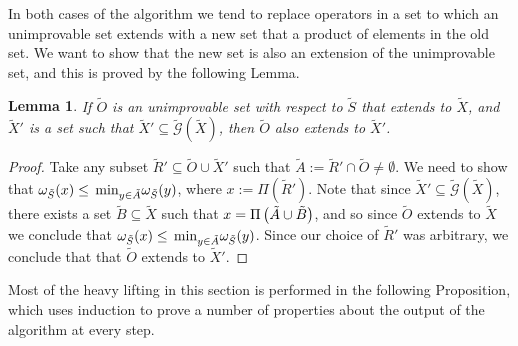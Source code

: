 \documentclass[twocolumn,showpacs,preprintnumbers,amsmath,amssymb,nofootinbib,pra,floatfix]{revtex4-1}
\newtheorem{lemma}{Lemma}
\newenvironment{remark}[1][Remark]{\begin{trivlist}
\item[\hskip \labelsep {\bfseries #1}]}{\end{trivlist}}
\newcommand{\set}{\tilde}
\newcommand{\genfun}{\tilde{\mathcal{G}}}
\begin{document}
\begin{remark}
In both cases of the algorithm we tend to replace operators in a set to which an unimprovable set extends with a new set that a product of elements in the old set.  We want to show that the new set is also an extension of the unimprovable set, and this is proved by the following Lemma.
\end{remark}

\begin{lemma}
\label{lemma:recombining extension elements preserves extension}
If $\set O$ is an unimprovable set with respect to $\set S$ that extends to $\set X$, and $\set X'$ is a set such that $\set X'\subseteq\genfun(\set X)$, then $\set O$ also extends to $\set X'$.
\end{lemma}

\begin{proof}
Take any subset $\set R' \subseteq \set O\cup\set X'$ such that $\set A := \set R'\cap \set O \ne \emptyset$.  We need to show that $\om_{\set S}(x)\le\min_{y\in\set A}\om_{\set S}(y)$, where $x := \Pi(\set R')$.  Note that since $\set X'\subseteq\genfun(\set X)$, there exists a set $\set B\subseteq \set X$ such that $x = \Pi\paren{\set A\cup\set B}$, and so since $\set O$ extends to $\set X$ we conclude that $\om_{\set S}(x)\le\min_{y\in\set A}\om_{\set S}(y)$.  Since our choice of $\set R'$ was arbitrary, we conclude that that $\set O$ extends to $\set X'$.
\end{proof}
\begin{remark}
Most of the heavy lifting in this section is performed in the following Proposition, which uses induction to prove a number of properties about the output of the algorithm at every step.
\end{remark}
\end{document}
